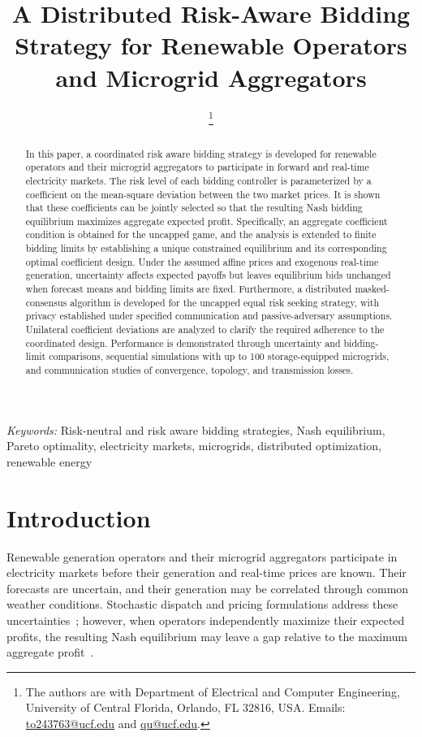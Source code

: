 \documentclass[journal]{IEEEtran}
\title{A Distributed Risk-Aware Bidding Strategy for Renewable Operators and Microgrid Aggregators}
\author{\IEEEauthorblockN{Tommy Truong and Zhihua Qu
}
\thanks{The authors are with Department of Electrical and Computer Engineering, University of Central Florida, Orlando, FL 32816, USA. Emails: \href{mailto:to243763@ucf.edu}{to243763@ucf.edu} and 
\href{mailto:qu@ucf.edu}{qu@ucf.edu}.}}
\begin{document}
\maketitle

\begin{abstract}
In this paper, a coordinated risk aware bidding strategy is developed for renewable operators and their microgrid aggregators to participate in forward and real-time electricity markets. The risk level of each bidding controller is parameterized by a coefficient on the mean-square deviation between the two market prices. It is shown that these coefficients can be jointly selected so that the resulting Nash bidding equilibrium maximizes aggregate expected profit. Specifically, an aggregate coefficient condition is obtained for the uncapped game, and the analysis is extended to finite bidding limits by establishing a unique constrained equilibrium and its corresponding optimal coefficient design. Under the assumed affine prices and exogenous real-time generation, uncertainty affects expected payoffs but leaves equilibrium bids unchanged when forecast means and bidding limits are fixed. Furthermore, a distributed masked-consensus algorithm is developed for the uncapped equal risk seeking strategy, with privacy established under specified communication and passive-adversary assumptions. Unilateral coefficient deviations are analyzed to clarify the required adherence to the coordinated design. Performance is demonstrated through uncertainty and bidding-limit comparisons, sequential simulations with up to 100 storage-equipped microgrids, and communication studies of convergence, topology, and transmission losses.
\end{abstract}

{\it Keywords:} Risk-neutral and risk aware bidding strategies, Nash equilibrium, Pareto optimality, electricity markets, microgrids, distributed optimization, renewable energy

\section{Introduction}

Renewable generation operators and their microgrid aggregators participate in electricity markets before their generation and real-time prices are known. Their forecasts are uncertain, and their generation may be correlated through common weather conditions. Stochastic dispatch and pricing formulations address these uncertainties~\cite{dvorkin2020chance,wong2007pricing,mieth2020distribution,7930435}; however, when operators independently maximize their expected profits, the resulting Nash equilibrium may leave a gap relative to the maximum aggregate profit~\cite{zhang2016competition,lee2015rational,HobbsPang2007}.
\end{document}
